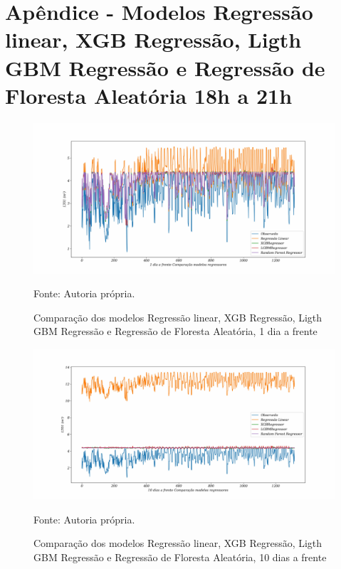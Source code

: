 
\section{Ap\^endice - Modelos Regress\~ao linear, XGB Regress\~ao, Ligth GBM Regress\~ao e Regress\~ao de Floresta Aleat\'oria 18h a 21h}\label{sec:lrxgblgbmrf18}

\begin{figure}[H]
	\centering
	\caption{Comparação dos modelos Regressão linear, XGB Regressão, Ligth GBM Regressão e Regressão de Floresta Aleatória, 1 dia a frente }
	\label{fig:1-LR-XGB-LGBM-RF}
	\includegraphics[width=1\linewidth]{Apendices/Figuras/modelagem-18-a-21h/1-LR-XGB-LGBM-RF}
	
	Fonte: Autoria própria.
\end{figure}

\begin{figure}[H]
	\centering
	\caption{Comparação dos modelos Regressão linear, XGB Regressão, Ligth GBM Regressão e Regressão de Floresta Aleatória, 10 dias a frente }
	\label{fig:10-LR-XGB-LGBM-RF}
	\includegraphics[width=1\linewidth]{Apendices/Figuras/modelagem-18-a-21h/10-LR-XGB-LGBM-RF}
	
	Fonte: Autoria própria.
\end{figure}



